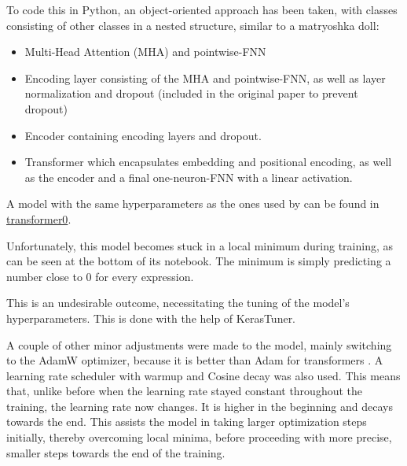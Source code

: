 \documentclass{article}
\begin{document}
To code this in Python, an object-oriented approach has been taken, with classes consisting of other classes in a nested structure, similar to a matryoshka doll:

\begin{itemize}
    \item Multi-Head Attention (MHA) and pointwise-FNN
    \item Encoding layer consisting of the MHA and pointwise-FNN, as well as layer normalization and dropout (included in the original paper to prevent dropout)
    \item Encoder containing encoding layers and dropout.
    \item Transformer which encapsulates embedding and positional encoding, as well as the encoder and a final one-neuron-FNN with a linear activation.
\end{itemize}

A model with the same hyperparameters as the ones used by \cite{vaswani2023attentionneed} can be found in \href{https://github.com/AntonStantan/matura/blob/main/transformer/transformer0.ipynb}{transformer0}.

Unfortunately, this model becomes stuck in a local minimum during training, as can be seen at the bottom of its notebook. The minimum is simply predicting a number close to 0 for every expression.

This is an undesirable outcome, necessitating the tuning of the model's hyperparameters. This is done with the help of KerasTuner.

A couple of other minor adjustments were made to the model, mainly switching to the AdamW optimizer, because it is better than Adam for transformers \cite{loshchilov2019decoupledweightdecayregularization}. A learning rate scheduler with warmup and Cosine decay was also used. This means that, unlike before when the learning rate stayed constant throughout the training, the learning rate now changes. It is higher in the beginning and decays towards the end. This assists the model in taking larger optimization steps initially, thereby overcoming local minima, before proceeding with more precise, smaller steps towards the end of the training.
\end{document}

